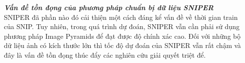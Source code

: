 {    \noindent
    \textbf{\textit{Vấn đề tồn đọng của phương pháp chuẩn bị dữ liệu SNIPER }} \\
    SNIPER  đã phần nào đó cải thiện một cách đáng kể vấn đề về thời gian train của SNIP.
    Tuy nhiên, trong quá trình dự đoán, SNIPER  vẫn cần phải sử dụng phương pháp Image Pyramids để đạt được độ chính xác cao.
    Đối với những bộ dữ liệu ảnh có kích thước lớn thì tốc độ dự đoán của SNIPER  vẫn rất chậm và đây là vấn đề tồn đọng thúc đẩy các nghiên cứu giải quyết triệt để.
}